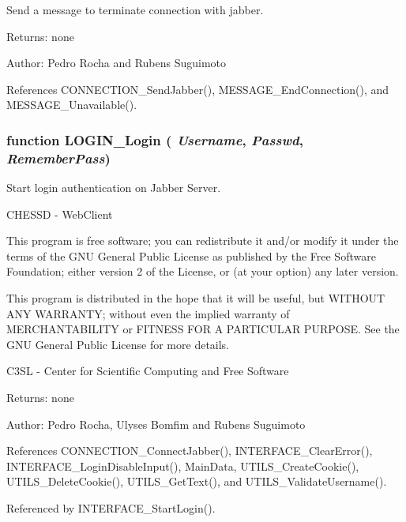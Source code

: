 Send a message to terminate connection with jabber. 

\begin{Desc}
\item[Returns:]none \end{Desc}
\begin{Desc}
\item[Author:]Pedro Rocha and Rubens Suguimoto \end{Desc}


References CONNECTION\_\-SendJabber(), MESSAGE\_\-EndConnection(), and MESSAGE\_\-Unavailable().
\subsubsection[LOGIN\_\-Login]{\setlength{\rightskip}{0pt plus 5cm}function LOGIN\_\-Login ( {\em Username}, \/   {\em Passwd}, \/   {\em RememberPass})}\label{login_2login_8js_73ab8ff3845c2f8dde38108edf013078}


Start login authentication on Jabber Server. 

CHESSD - WebClient

This program is free software; you can redistribute it and/or modify it under the terms of the GNU General Public License as published by the Free Software Foundation; either version 2 of the License, or (at your option) any later version.

This program is distributed in the hope that it will be useful, but WITHOUT ANY WARRANTY; without even the implied warranty of MERCHANTABILITY or FITNESS FOR A PARTICULAR PURPOSE. See the GNU General Public License for more details.

C3SL - Center for Scientific Computing and Free Software \begin{Desc}
\item[Returns:]none \end{Desc}
\begin{Desc}
\item[Author:]Pedro Rocha, Ulyses Bomfim and Rubens Suguimoto \end{Desc}


References CONNECTION\_\-ConnectJabber(), INTERFACE\_\-ClearError(), INTERFACE\_\-LoginDisableInput(), MainData, UTILS\_\-CreateCookie(), UTILS\_\-DeleteCookie(), UTILS\_\-GetText(), and UTILS\_\-ValidateUsername().

Referenced by INTERFACE\_\-StartLogin().
